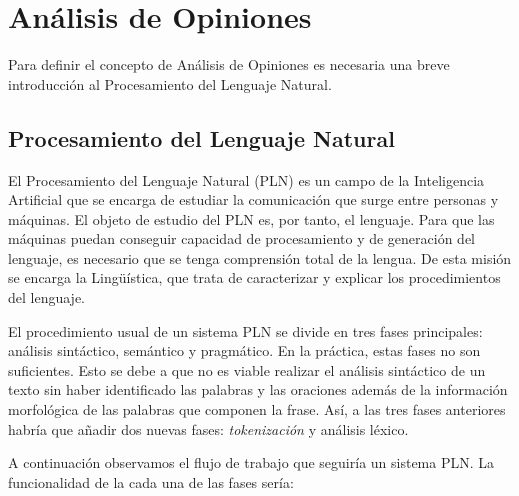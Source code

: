 

\chapter{Análisis de Opiniones}

	Para definir el concepto de Análisis de Opiniones es necesaria una breve introducción al Procesamiento del Lenguaje Natural.

\section{Procesamiento del Lenguaje Natural} \label{conceptsentiment}	
	
	 El Procesamiento del Lenguaje Natural (PLN) es un campo de la Inteligencia Artificial que se encarga de estudiar la comunicación que surge entre personas y máquinas. El objeto de estudio del PLN es, por tanto, el lenguaje. Para que las máquinas puedan conseguir capacidad de procesamiento y de generación del lenguaje, es necesario que se tenga comprensión total de la lengua. De esta misión se encarga la Lingüística, que trata de caracterizar y explicar los procedimientos del lenguaje.
	
	El procedimiento usual de un sistema PLN se divide en tres fases principales: análisis sintáctico, semántico y pragmático. En la práctica, estas fases no son suficientes. Esto se debe a que no es viable realizar el análisis sintáctico de un texto sin haber identificado las palabras y las oraciones además de la información morfológica de las palabras que componen la frase. Así, a las tres fases anteriores habría que añadir dos nuevas fases: \textit{tokenización} y análisis léxico.
	
	
	A continuación observamos el flujo de trabajo que seguiría un sistema PLN. La funcionalidad de la cada una de las fases sería:

